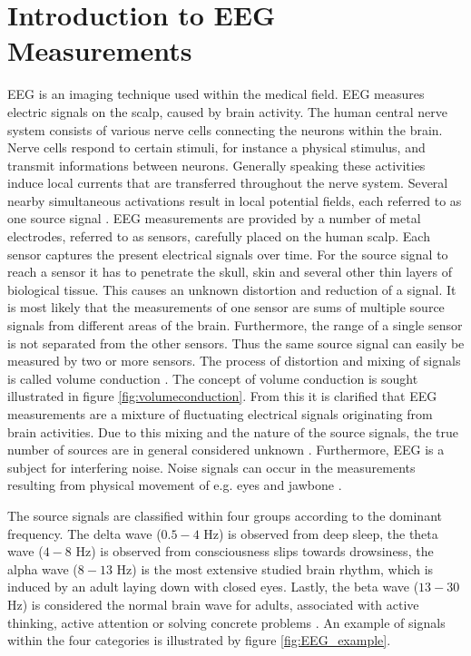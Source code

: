 \section{Introduction to EEG Measurements}\label{sec:EEG}
EEG is an imaging technique used within the medical field. EEG measures electric signals on the scalp, caused by brain activity. 
The human central nerve system consists of various nerve cells connecting the neurons within the brain. Nerve cells respond to certain stimuli, for instance a physical stimulus, and transmit informations between neurons.
Generally speaking these activities induce local currents that are transferred throughout the nerve system. 
Several nearby simultaneous activations result in local potential fields, each referred to as one source signal \cite{EEGsignalprocessing}. 
EEG measurements are provided by a number of metal electrodes, referred to as sensors, carefully placed on the human scalp. 
Each sensor captures the present electrical signals over time.
For the source signal to reach a sensor it has to penetrate the skull, skin and several other thin layers of biological tissue. 
This causes an unknown distortion and reduction of a signal.
It is most likely that the measurements of one sensor are sums of multiple source signals from different areas of the brain.
Furthermore, the range of a single sensor is not separated from the other sensors. 
Thus the same source signal can easily be measured by two or more sensors.
The process of distortion and mixing of signals is called volume conduction \cite{EEGsignalprocessing}\cite{Van2019}. 
The concept of volume conduction is sought illustrated in figure \ref{fig:volumeconduction}.
From this it is clarified that EEG measurements are a mixture of fluctuating electrical signals originating from brain activities. Due to this mixing and the nature of the source signals, the true number of sources are in general considered unknown \cite{EEGsignalprocessing}. 
Furthermore, EEG is a subject for interfering noise. Noise signals can occur in the measurements resulting from physical movement of e.g. eyes and jawbone \cite{fundamentalEEG}.

The source signals are classified within four groups according to the dominant frequency. 
The delta wave ($0.5-4$ Hz) is observed from deep sleep, the theta wave ($4-8$ Hz) is observed from consciousness slips towards drowsiness, the alpha wave ($8-13$ Hz) is the most extensive studied brain rhythm, which is induced by an adult laying down with closed eyes. 
Lastly, the beta wave ($13-30$ Hz) is considered the normal brain wave for adults, associated with active thinking, active attention or solving concrete problems \cite[p. 10]{EEGsignalprocessing}. 
An example of signals within the four categories is illustrated by figure \ref{fig:EEG_example}. 

